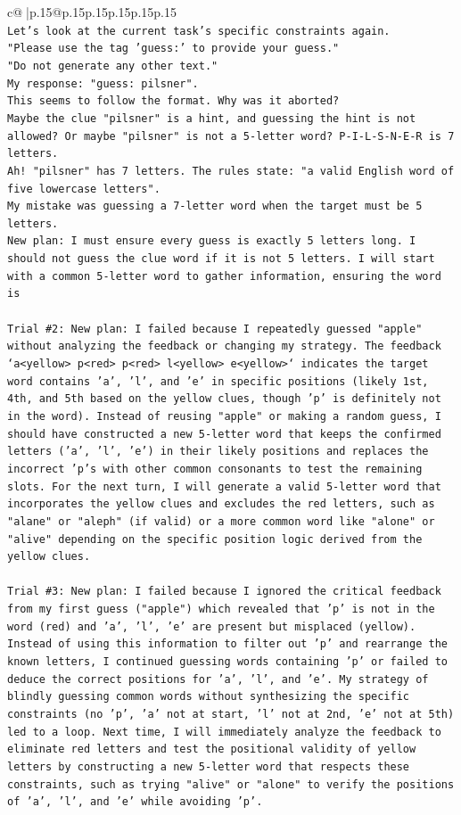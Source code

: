 \documentclass{article}
\begin{document}
{\begin{supertabular}{c@{$\;$}|p{.15\linewidth}@{}p{.15\linewidth}p{.15\linewidth}p{.15\linewidth}p{.15\linewidth}p{.15\linewidth}}
{{{\\ 
\texttt{Let's look at the current task's specific constraints again.} \\
\texttt{"Please use the tag 'guess:' to provide your guess."} \\
\texttt{"Do not generate any other text."} \\
\texttt{My response: "guess: pilsner".} \\
\texttt{This seems to follow the format. Why was it aborted?} \\
\texttt{Maybe the clue "pilsner" is a hint, and guessing the hint is not allowed? Or maybe "pilsner" is not a 5{-}letter word? P{-}I{-}L{-}S{-}N{-}E{-}R is 7 letters.} \\
\texttt{Ah! "pilsner" has 7 letters. The rules state: "a valid English word of five lowercase letters".} \\
\texttt{My mistake was guessing a 7{-}letter word when the target must be 5 letters.} \\
\texttt{New plan: I must ensure every guess is exactly 5 letters long. I should not guess the clue word if it is not 5 letters. I will start with a common 5{-}letter word to gather information, ensuring the word is} \\
\\ 
\texttt{Trial \#2: New plan: I failed because I repeatedly guessed "apple" without analyzing the feedback or changing my strategy. The feedback `a<yellow> p<red> p<red> l<yellow> e<yellow>` indicates the target word contains 'a', 'l', and 'e' in specific positions (likely 1st, 4th, and 5th based on the yellow clues, though 'p' is definitely not in the word). Instead of reusing "apple" or making a random guess, I should have constructed a new 5{-}letter word that keeps the confirmed letters ('a', 'l', 'e') in their likely positions and replaces the incorrect 'p's with other common consonants to test the remaining slots. For the next turn, I will generate a valid 5{-}letter word that incorporates the yellow clues and excludes the red letters, such as "alane" or "aleph" (if valid) or a more common word like "alone" or "alive" depending on the specific position logic derived from the yellow clues.} \\
\\ 
\texttt{Trial \#3: New plan: I failed because I ignored the critical feedback from my first guess ("apple") which revealed that 'p' is not in the word (red) and 'a', 'l', 'e' are present but misplaced (yellow). Instead of using this information to filter out 'p' and rearrange the known letters, I continued guessing words containing 'p' or failed to deduce the correct positions for 'a', 'l', and 'e'. My strategy of blindly guessing common words without synthesizing the specific constraints (no 'p', 'a' not at start, 'l' not at 2nd, 'e' not at 5th) led to a loop. Next time, I will immediately analyze the feedback to eliminate red letters and test the positional validity of yellow letters by constructing a new 5{-}letter word that respects these constraints, such as trying "alive" or "alone" to verify the positions of 'a', 'l', and 'e' while avoiding 'p'.} \\
}}}
\end{supertabular}}
\end{document}
